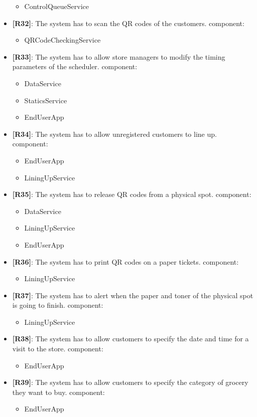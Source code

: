 \begin{itemize}
\begin{itemize}
	\item ControlQueueService 
	\end{itemize}
	\item {\textbf{[R32]}}: The system has to scan the QR codes of the customers.
component:
	\begin{itemize}
	\item QRCodeCheckingService
	\end{itemize}
	\item {\textbf{[R33]}}: The system has to allow store managers to modify the timing parameters of the scheduler.
component:
	\begin{itemize}
	\item DataService 
	\item StaticsService 
	\item EndUserApp 
	\end{itemize}
	\item {\textbf{[R34]}}: The system has to allow unregistered customers to line up.
component:
	\begin{itemize}
	\item EndUserApp 
	\item LiningUpService
	\end{itemize}
	\item {\textbf{[R35]}}: The system has to release QR codes from a physical spot.
component:
	\begin{itemize}
	\item DataService 
	\item LiningUpService 
	\item EndUserApp 
	\end{itemize}
	\item {\textbf{[R36]}}: The system has to print QR codes on a paper tickets.
component:
	\begin{itemize}
	\item LiningUpService
	\end{itemize}
	\item {\textbf{[R37]}}: The system has to alert when the paper and toner of the physical spot is going to finish.
component:
	\begin{itemize}
	\item LiningUpService
	\end{itemize}
	\item {\textbf{[R38]}}: The system has to allow customers to specify the date and time for a visit to the store.
component:
	\begin{itemize}
	\item EndUserApp
	\end{itemize}
	\item {\textbf{[R39]}}: The system has to allow customers to specify the category of grocery they want to buy.
component:
	\begin{itemize}
	\item EndUserApp
	\end{itemize}

\end{itemize}
